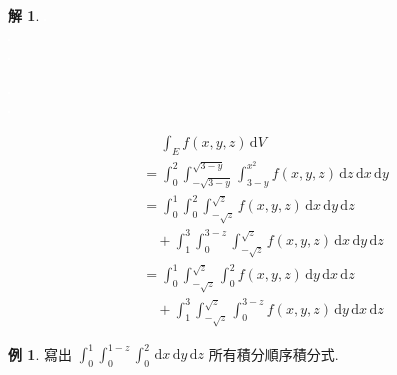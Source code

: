 \documentclass[12pt]{extarticle}
\newcommand{\ds}{\displaystyle}
\theoremstyle{definition}
\newtheorem*{ex}{例}
\newtheorem*{sol}{解}
\begin{document}
{\begin{sol}
  \begin{minipage}{0.15\textwidth}
    \includegraphics[scale=0.6,page=34]{fig/prob.pdf} \\
    \includegraphics[scale=0.6,page=35]{fig/prob.pdf} \\ 
    \includegraphics[scale=0.6,page=36]{fig/prob.pdf} 
  \end{minipage}
  \begin{minipage}{0.3\textwidth}
    \includegraphics[scale=0.85,page=37]{fig/prob.pdf} \\
    \includegraphics[scale=0.85,page=38]{fig/prob.pdf} \\ 
  \end{minipage}
  \begin{minipage}{0.55\textwidth}
    \begin{align*}
      &\quad\;\int_E f(x, y, z)\,\text{d}V \\
      &= \int_{0}^{2}\!\int_{-\sqrt{3 - y}}^{\sqrt{3 - y}}\int_{3 - y}^{x^2}f(x, y, z)\,\text{d}z\,\text{d}x\,\text{d}y \\
      &= \int_{0}^{1}\!\int_{0}^{2}\!\int_{-\sqrt{z}}^{\sqrt{z}} f(x, y, z)\,\text{d}x\,\text{d}y\,\text{d}z \\
      &\quad + \int_{1}^{3}\!\!\int_{0}^{3 - z}\!\!\int_{-\sqrt{z}}^{\sqrt{z}}f(x, y, z)\,\text{d}x\,\text{d}y\,\text{d}z \\
      &= \int_{0}^{1}\!\int_{-\sqrt{z}}^{\sqrt{z}}\int_{0}^{2}\!f(x, y, z)\,\text{d}y\,\text{d}x\,\text{d}z \\
      &\quad + \int_{1}^{3}\!\int_{-\sqrt{z}}^{\sqrt{z}}\int_{0}^{3 - z}\!\!f(x, y, z)\,\text{d}y\,\text{d}x\,\text{d}z 
    \end{align*}
  \end{minipage}
\end{sol}

\begin{ex}
  寫出 $\ds\int_0^1\!\!\int_0^{1 - z}\!\!\!\int_0^{2}\!\!\,\text{d}x\,\text{d}y\,\text{d}z$ 所有積分順序積分式.
\end{ex}

}
\end{document}
